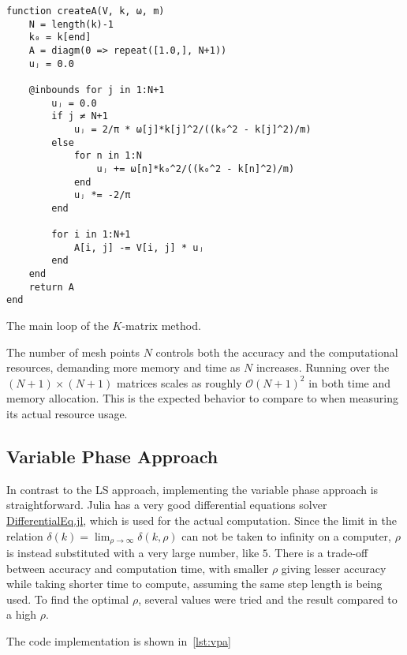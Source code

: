 \begin{listing}
\begin{verbatim}
function createA(V, k, ω, m)
    N = length(k)-1
    k₀ = k[end]
    A = diagm(0 => repeat([1.0,], N+1))
    uⱼ = 0.0

    @inbounds for j in 1:N+1
        uⱼ = 0.0
        if j ≠ N+1
            uⱼ = 2/π * ω[j]*k[j]^2/((k₀^2 - k[j]^2)/m)
        else
            for n in 1:N
                uⱼ += ω[n]*k₀^2/((k₀^2 - k[n]^2)/m)
            end
            uⱼ *= -2/π
        end

        for i in 1:N+1
            A[i, j] -= V[i, j] * uⱼ
        end
    end
    return A
end
\end{verbatim}
\caption{The main loop of the \(K\)-matrix method.\label{lst:kmatrix}}
\end{listing}


The number of mesh points \(N\) controls both the accuracy and the computational
resources, demanding more memory and time as \(N\) increases. Running over the
\((N+1)\times (N+1)\) matrices scales as roughly \(\mathcal{O}(N+1)^{2}\) in
both time and memory allocation. This is the expected behavior to compare to
when measuring its actual resource usage.

\subsection{Variable Phase Approach}
In contrast to the LS approach, implementing the variable phase approach is
straightforward. Julia has a very good differential equations solver
\href{https://diffeq.sciml.ai/stable/#Getting-Started:-Installation-And-First-Steps}{DifferentialEq.jl}\cite{rackauckas2017differentialequations}, which is used for the actual computation.
Since the limit in the relation \(\delta(k) =
\lim_{\rho\to\infty}\delta(k, \rho)\) can not be taken to infinity on a computer, 
\(\rho\) is instead substituted with a very large number, like \(5\). There is a
trade-off between accuracy and computation time, with smaller \(\rho\) giving
lesser accuracy while taking shorter time to compute, assuming the same step
length is being used. To find the optimal \(\rho\), several values were tried
and the result compared to a high \(\rho\).

The code implementation is shown in~\cref{lst:vpa}


